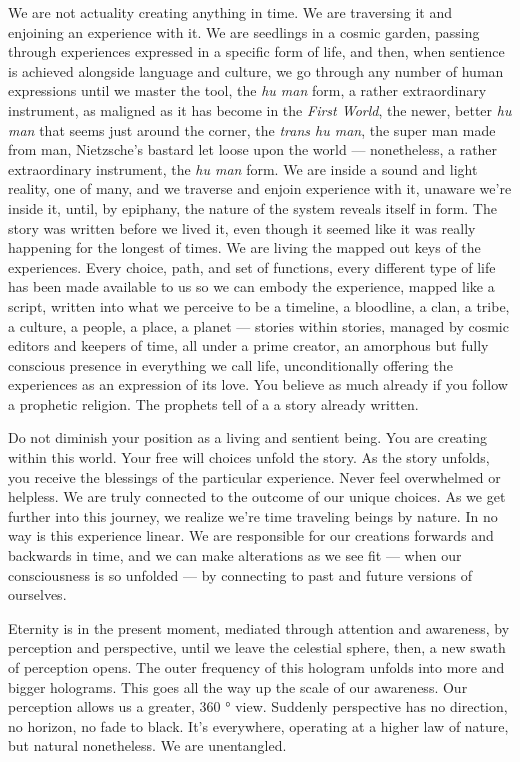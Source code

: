 We are not actuality creating anything in time. We are traversing it and
enjoining an experience with it. We are seedlings in a cosmic garden,
passing through experiences expressed in a specific form of life, and
then, when sentience is achieved alongside language and culture, we go
through any number of human expressions until we master the tool, the
\emph{hu man} form, a rather extraordinary instrument, as maligned as it
has become in the \emph{First World}, the newer, better \emph{hu man}
that seems just around the corner, the \emph{trans hu man}, the super
man made from man, Nietzsche's bastard let loose upon the world ---
nonetheless, a rather extraordinary instrument, the \emph{hu man} form.
We are inside a sound and light reality, one of many, and we traverse
and enjoin experience with it, unaware we're inside it, until, by
epiphany, the nature of the system reveals itself in form. The story was
written before we lived it, even though it seemed like it was really
happening for the longest of times. We are living the mapped out keys of
the experiences. Every choice, path, and set of functions, every
different type of life has been made available to us so we can embody
the experience, mapped like a script, written into what we perceive to
be a timeline, a bloodline, a clan, a tribe, a culture, a people, a
place, a planet --- stories within stories, managed by cosmic editors
and keepers of time, all under a prime creator, an amorphous but fully
conscious presence in everything we call life, unconditionally offering
the experiences as an expression of its love. You believe as much
already if you follow a prophetic religion. The prophets tell of a a
story already written.

Do not diminish your position as a living and sentient being. You are
creating within this world. Your free will choices unfold the story. As
the story unfolds, you receive the blessings of the particular
experience. Never feel overwhelmed or helpless. We are truly connected
to the outcome of our unique choices. As we get further into this
journey, we realize we're time traveling beings by nature. In no way is
this experience linear. We are responsible for our creations forwards
and backwards in time, and we can make alterations as we see fit ---
when our consciousness is so unfolded --- by connecting to past and
future versions of ourselves.

Eternity is in the present moment, mediated through attention and
awareness, by perception and perspective, until we leave the celestial
sphere, then, a new swath of perception opens. The outer frequency of
this hologram unfolds into more and bigger holograms. This goes all the
way up the scale of our awareness. Our perception allows us a greater,
360 ° view. Suddenly perspective has no direction, no horizon, no fade
to black. It's everywhere, operating at a higher law of nature, but
natural nonetheless. We are unentangled.

